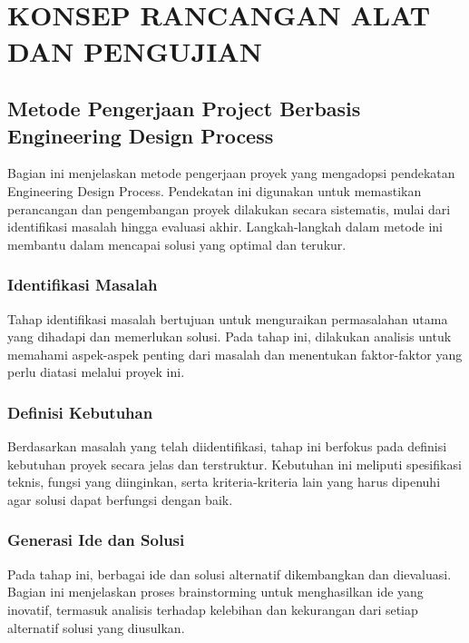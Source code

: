 
\chapter[KONSEP RANCANGAN ALAT DAN PENGUJIAN]{\\ KONSEP RANCANGAN ALAT DAN PENGUJIAN}

\section{Metode Pengerjaan Project Berbasis Engineering Design Process}
Bagian ini menjelaskan metode pengerjaan proyek yang mengadopsi pendekatan Engineering Design Process. Pendekatan ini digunakan untuk memastikan perancangan dan pengembangan proyek dilakukan secara sistematis, mulai dari identifikasi masalah hingga evaluasi akhir. Langkah-langkah dalam metode ini membantu dalam mencapai solusi yang optimal dan terukur.

\subsection{Identifikasi Masalah}
Tahap identifikasi masalah bertujuan untuk menguraikan permasalahan utama yang dihadapi dan memerlukan solusi. Pada tahap ini, dilakukan analisis untuk memahami aspek-aspek penting dari masalah dan menentukan faktor-faktor yang perlu diatasi melalui proyek ini.

\subsection{Definisi Kebutuhan}
Berdasarkan masalah yang telah diidentifikasi, tahap ini berfokus pada definisi kebutuhan proyek secara jelas dan terstruktur. Kebutuhan ini meliputi spesifikasi teknis, fungsi yang diinginkan, serta kriteria-kriteria lain yang harus dipenuhi agar solusi dapat berfungsi dengan baik.

\subsection{Generasi Ide dan Solusi}
Pada tahap ini, berbagai ide dan solusi alternatif dikembangkan dan dievaluasi. Bagian ini menjelaskan proses brainstorming untuk menghasilkan ide yang inovatif, termasuk analisis terhadap kelebihan dan kekurangan dari setiap alternatif solusi yang diusulkan.

